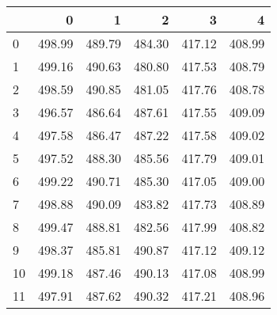 \begin{tabular}{lrrrrr}
\toprule
{} &       0 &       1 &       2 &       3 &       4 \\
\midrule
0  &  498.99 &  489.79 &  484.30 &  417.12 &  408.99 \\
1  &  499.16 &  490.63 &  480.80 &  417.53 &  408.79 \\
2  &  498.59 &  490.85 &  481.05 &  417.76 &  408.78 \\
3  &  496.57 &  486.64 &  487.61 &  417.55 &  409.09 \\
4  &  497.58 &  486.47 &  487.22 &  417.58 &  409.02 \\
5  &  497.52 &  488.30 &  485.56 &  417.79 &  409.01 \\
6  &  499.22 &  490.71 &  485.30 &  417.05 &  409.00 \\
7  &  498.88 &  490.09 &  483.82 &  417.73 &  408.89 \\
8  &  499.47 &  488.81 &  482.56 &  417.99 &  408.82 \\
9  &  498.37 &  485.81 &  490.87 &  417.12 &  409.12 \\
10 &  499.18 &  487.46 &  490.13 &  417.08 &  408.99 \\
11 &  497.91 &  487.62 &  490.32 &  417.21 &  408.96 \\
\bottomrule
\end{tabular}

